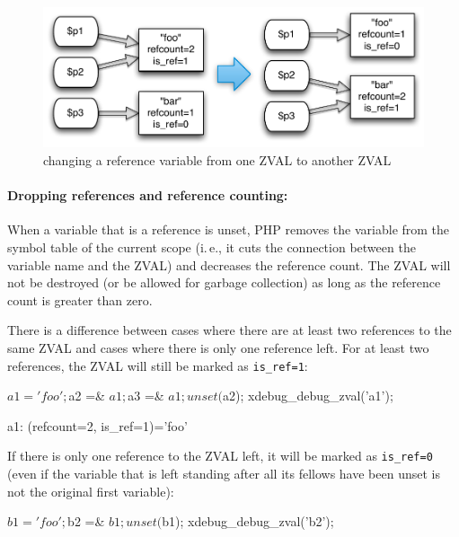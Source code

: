 \begin{figure}[!h]
  \begin{center}
    \includegraphics[scale=0.8]{images/p1_p2_p3}
    \caption{changing a reference variable from one ZVAL to another ZVAL}
    \label{fig:changing-references}
  \end{center}
\end{figure}




\paragraph{Dropping references and reference counting:}

When a variable that is a reference is unset, PHP removes the variable from the symbol table of the current scope (i.\,e., it cuts the connection between the variable name and the ZVAL) and decreases the reference count. The ZVAL will not be destroyed (or be allowed for garbage collection) as long as the reference count is greater than zero.

There is a difference between cases where there are at least two references to the same ZVAL and cases where there is only one reference left. For at least two references, the ZVAL will still be marked as \texttt{is\_ref=1}:

\begin{phpcode}
$a1 = 'foo';
$a2 =& $a1;
$a3 =& $a1;
unset($a2);
xdebug_debug_zval('a1');
\end{phpcode}

\begin{textcode}
a1: (refcount=2, is_ref=1)='foo'
\end{textcode}

If there is only one reference to the ZVAL left, it will be marked as \texttt{is\_ref=0} (even if the variable that is left standing after all its fellows have been unset is not the original first variable):

\begin{phpcode}
$b1 = 'foo';
$b2 =& $b1;
unset($b1);
xdebug_debug_zval('b2');
\end{phpcode}

